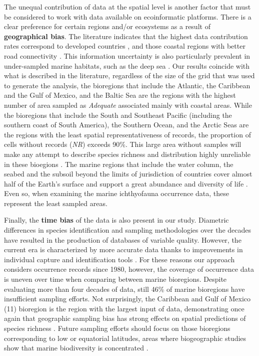 \documentclass[12pt,authoryear]{elsarticle}
\begin{document}
The unequal contribution of data at the spatial level is another factor that must be considered to work with data available on ecoinformatic platforms. There is a clear preference for certain regions and/or ecosystems as a result of \textbf{geographical bias}. The literature indicates that the highest data contribution rates correspond to developed countries \citep{yesson2007,chandler2017}, and those coastal regions with better road connectivity \citep{chandler2017,melo2020}. This information uncertainty is also particularly prevalent in under-sampled marine habitats, such as the deep sea \citep{webb2010}. Our results coincide with what is described in the literature, regardless of the size of the grid that was used to generate the analysis, the bioregions that include the Atlantic, the Caribbean and the Gulf of Mexico, and the Baltic Sea are the regions with the highest number of area sampled as \textit{Adequate} associated mainly with coastal areas. While the bioregions that include the South and Southeast Pacific (including the southern coast of South America), the Southern Ocean, and the Arctic Seas are the regions with the least spatial representativeness of records, the proportion of cells without records (\textit{NR}) exceeds 90\%. This large area without samples will make any attempt to describe species richness and distribution highly unreliable in these bioegions \citep{yang2013geographical, troia2017}. The marine regions that include the water column, the seabed and the subsoil beyond the limits of jurisdiction of countries cover almost half of the Earth's surface and support a great abundance and diversity of life \citep{visalli2020}. Even so, when examining the marine ichthyofauna occurrence data, these represent the least sampled areas.

Finally, the \textbf{time bias} of the data is also present in our study. Diametric differences in species identification and sampling methodologies over the decades have resulted in the production of databases of variable quality. However, the current era is characterized by more accurate data thanks to improvements in individual capture and identification tools \citep{costello2015conser,jin2020bdcleaner}. For these reasons our approach considers occurrence records since 1980, however, the coverage of occurrence data is uneven over time when comparing between marine bioregions. Despite evaluating more than four decades of data, still 46\% of marine bioregions have insufficient sampling efforts. Not surprisingly, the Caribbean and Gulf of Mexico (11) bioregion is the region with the largest input of data, demonstrating once again that geographic sampling bias has strong effects on spatial predictions of species richness \citep{yang2013geographical}. Future sampling efforts should focus on those bioregions corresponding to low or equatorial latitudes, areas where biogeographic studies show that marine biodiversity is concentrated \citep{costello2017marine}.
\end{document}

